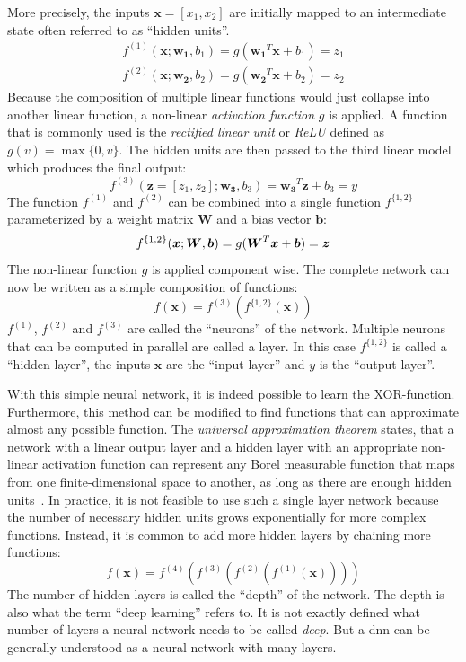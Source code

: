 More precisely, the inputs $\boldsymbol{x} = [x_1,x_2]$ are initially mapped to an intermediate state often referred to as \enquote{hidden units}.
\begin{align*}
    f^{(1)}(\boldsymbol{x}; \boldsymbol{w_1}, b_1) = g(\boldsymbol{w_1}^T \boldsymbol{x} + b_{1}) = z_1 \\
    f^{(2)}(\boldsymbol{x}; \boldsymbol{w_2}, b_2) = g(\boldsymbol{w_2}^T \boldsymbol{x} + b_{2}) = z_2
\end{align*}
Because the composition of multiple linear functions would just collapse into another linear function, a non-linear \textit{activation function} $g$ is applied.
A function that is commonly used is the \textit{rectified linear unit} or \textit{ReLU} defined as $g(v) = \max\{0, v\}$.
The hidden units are then passed to the third linear model which produces the final output:
\[
    f^{(3)}(\boldsymbol{z} = [z_1, z_2]; \boldsymbol{w_3}, b_3) = \boldsymbol{w_3}^T \boldsymbol{z} + b_{3} = y
\]
The function $f^{(1)}$ and $f^{(2)}$ can be combined into a single function $f^{\{1, 2\}}$ parameterized by a weight matrix $\boldsymbol{W}$ and a bias vector $\boldsymbol{b}$:
\[
    f^{\{1, 2\}}(\boldsymbol{x}; \boldsymbol{W}, \boldsymbol{b}) = g(\boldsymbol{W}^T \boldsymbol{x}+ \boldsymbol{b}) = \boldsymbol{z} \\
\]
The non-linear function $g$ is applied component wise.
The complete network can now be written as a simple composition of functions:
\[
    f(\boldsymbol{x}) = f^{(3)}(f^{\{1, 2\}}(\boldsymbol{x}))
\]
$f^{(1)}$, $f^{(2)}$ and $f^{(3)}$ are called the \enquote{neurons} of the network.
Multiple neurons that can be computed in parallel are called a layer.
In this case $f^{\{1, 2\}}$ is called a \enquote{hidden layer}, the inputs $\boldsymbol{x}$ are the \enquote{input layer} and $y$ is the \enquote{output layer}.

With this simple neural network, it is indeed possible to learn the XOR-function.
Furthermore, this method can be modified to find functions that can approximate almost any possible function.
The \textit{universal approximation theorem} states, that a network with a linear output layer and a hidden layer with an appropriate non-linear activation function can represent any Borel measurable function that maps from one finite-dimensional space to another, as long as there are enough hidden units~\autocite{Goodfellow-et-al-2016}.
In practice, it is not feasible to use such a single layer network because the number of necessary hidden units grows exponentially for more complex functions.
Instead, it is common to add more hidden layers by chaining more functions:
\[
    f(\boldsymbol{x}) = f^{(4)}(f^{(3)}(f^{(2)}(f^{(1)}(\boldsymbol{x}))))
\]
The number of hidden layers is called the \enquote{depth} of the network.
The depth is also what the term \enquote{deep learning} refers to.
It is not exactly defined what number of layers a neural network needs to be called \textit{deep}.
But a \acrlong{dnn} can be generally understood as a neural network with many layers.

